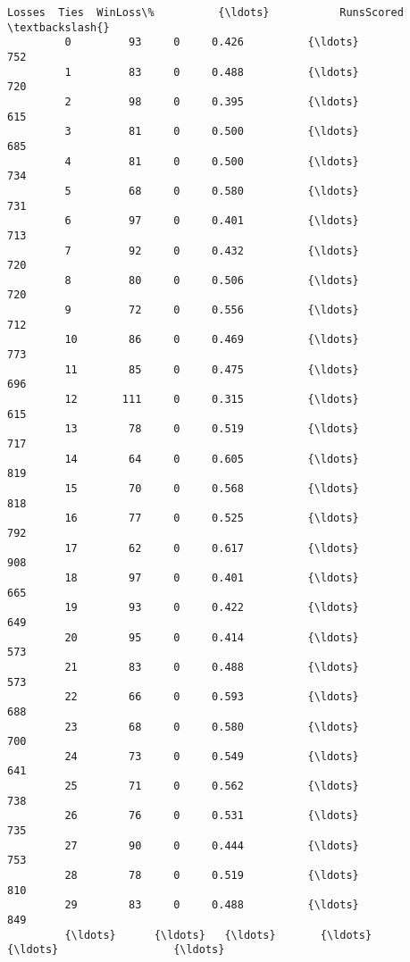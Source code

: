 \documentclass[11pt]{article}
\begin{document}
\begin{Verbatim}[commandchars=\\\{\}]
               Losses  Ties  WinLoss\%          {\ldots}           RunsScored  \textbackslash{}
         0         93     0     0.426          {\ldots}                  752   
         1         83     0     0.488          {\ldots}                  720   
         2         98     0     0.395          {\ldots}                  615   
         3         81     0     0.500          {\ldots}                  685   
         4         81     0     0.500          {\ldots}                  734   
         5         68     0     0.580          {\ldots}                  731   
         6         97     0     0.401          {\ldots}                  713   
         7         92     0     0.432          {\ldots}                  720   
         8         80     0     0.506          {\ldots}                  720   
         9         72     0     0.556          {\ldots}                  712   
         10        86     0     0.469          {\ldots}                  773   
         11        85     0     0.475          {\ldots}                  696   
         12       111     0     0.315          {\ldots}                  615   
         13        78     0     0.519          {\ldots}                  717   
         14        64     0     0.605          {\ldots}                  819   
         15        70     0     0.568          {\ldots}                  818   
         16        77     0     0.525          {\ldots}                  792   
         17        62     0     0.617          {\ldots}                  908   
         18        97     0     0.401          {\ldots}                  665   
         19        93     0     0.422          {\ldots}                  649   
         20        95     0     0.414          {\ldots}                  573   
         21        83     0     0.488          {\ldots}                  573   
         22        66     0     0.593          {\ldots}                  688   
         23        68     0     0.580          {\ldots}                  700   
         24        73     0     0.549          {\ldots}                  641   
         25        71     0     0.562          {\ldots}                  738   
         26        76     0     0.531          {\ldots}                  735   
         27        90     0     0.444          {\ldots}                  753   
         28        78     0     0.519          {\ldots}                  810   
         29        83     0     0.488          {\ldots}                  849   
         {\ldots}      {\ldots}   {\ldots}       {\ldots}          {\ldots}                  {\ldots}   

\end{Verbatim}
\end{document}
